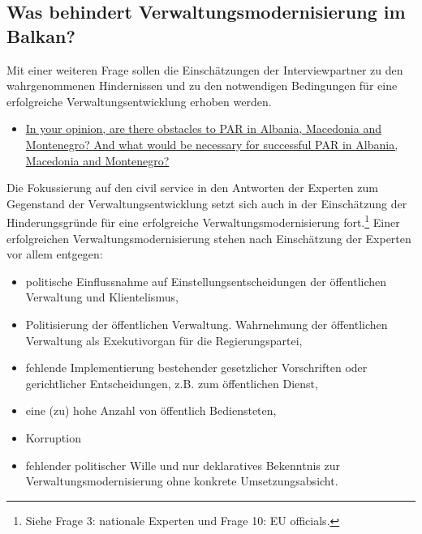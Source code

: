 \subsection{Was behindert Verwaltungsmodernisierung im Balkan? }
Mit einer weiteren Frage sollen die Einschätzungen der Interviewpartner zu den wahrgenommenen Hindernissen und zu den notwendigen Bedingungen für eine erfolgreiche Verwaltungsentwicklung erhoben werden.
\begin{itemize}[label={}]
\item \ul{In your opinion, are there obstacles to PAR in Albania, Macedonia and Montenegro? And what would be necessary for successful PAR in Albania, Macedonia and Montenegro?}
\end{itemize}
Die Fokussierung auf den civil service in den Antworten der Experten zum Gegenstand der Verwaltungsentwicklung setzt sich auch in der Einschätzung der Hinderungsgründe für eine erfolgreiche Verwaltungsmodernisierung fort.\footnote{Siehe Frage 3: nationale Experten und Frage 10: EU officials.} Einer erfolgreichen Verwaltungsmodernisierung stehen nach Einschätzung der Experten vor allem entgegen:
\begin{itemize} \itemsep1pt \parskip0pt 
\item politische Einflussnahme auf Einstellungsentscheidungen der öffentlichen Verwaltung und Klientelismus,
\item Politisierung der öffentlichen Verwaltung. Wahrnehmung der öffentlichen Verwaltung als Exekutivorgan für die Regierungspartei, 
\item fehlende Implementierung bestehender gesetzlicher Vorschriften oder gerichtlicher Entscheidungen, z.B. zum öffentlichen Dienst, 
\item eine (zu) hohe Anzahl von öffentlich Bediensteten, 
\item Korruption 
\item fehlender politischer Wille und nur deklaratives Bekenntnis zur Verwaltungsmodernisierung ohne konkrete Umsetzungsabsicht.
\end{itemize}

